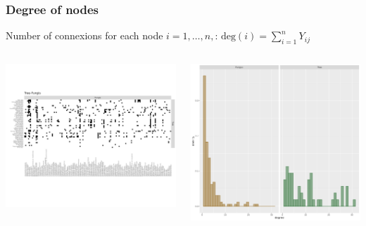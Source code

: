 \documentclass[compress,10pt]{beamer}
\begin{document}
\begin{frame}\frametitle{Degree of nodes}
Number of connexions for each node $i=  1, \dots, n,$: $\mbox{deg}(i)=  \sum_{i=1}^{n} Y_{ij}$
\begin{columns}
 \begin{column}{0.4 \textwidth}
\begin{center}
 \includegraphics[height=.96 \textwidth,angle  = 90]{plots/Tree_fungis_matrix}
\end{center}
 \end{column}
 \begin{column}{0.7 \textwidth}
\begin{center}
 \includegraphics[height=.6 \textheight]{plots/Tree_Fungis_degree.png}
\end{center}
 \end{column}
\end{columns}


\end{frame}
\end{document}
